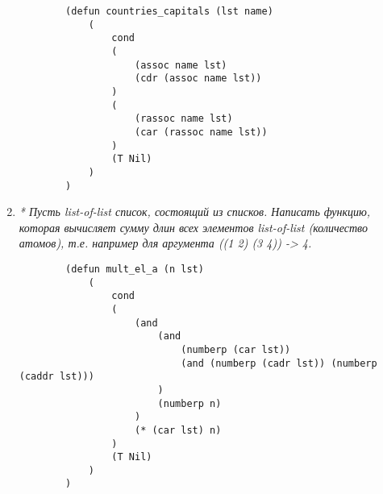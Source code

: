 \begin{enumerate}[wide=0pt]
	\begin{lstlisting}
		(defun countries_capitals (lst name)
			(
				cond 
				(
					(assoc name lst)
					(cdr (assoc name lst))
				)
				(
					(rassoc name lst)
					(car (rassoc name lst))
				)
				(T Nil)
			)
		)
	\end{lstlisting}



	\item  \textit{* Пусть list-of-list список, состоящий из списков. Написать функцию, которая
	вычисляет сумму длин всех элементов list-of-list (количество атомов), т.е. например
	для аргумента
	 ((1 2) (3 4)) -> 4.}

	\begin{lstlisting}
		(defun mult_el_a (n lst)
			(
				cond 
				(
					(and
						(and
							(numberp (car lst))
							(and (numberp (cadr lst)) (numberp (caddr lst)))
						)
						(numberp n)
					)
					(* (car lst) n)
				)
				(T Nil)
			)
		)
	\end{lstlisting}


\end{enumerate}